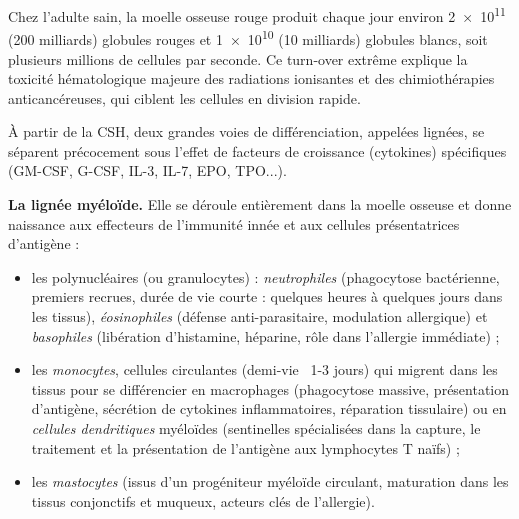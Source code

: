 \documentclass[11pt]{article}
\newcommand{\cle}[1]{{\popxbold\color{popdark}#1}}
\begin{document}
\begin{savaistu}
Chez l'adulte sain, la moelle osseuse rouge produit chaque jour environ \num{2e11} (200 milliards) globules rouges et \num{1e10} (10 milliards) globules blancs, soit plusieurs millions de cellules par seconde. Ce turn-over extrême explique la toxicité hématologique majeure des radiations ionisantes et des chimiothérapies anticancéreuses, qui ciblent les cellules en division rapide.
\end{savaistu}

À partir de la CSH, deux grandes voies de différenciation, appelées \cle{lignées}, se séparent précocement sous l'effet de facteurs de croissance (cytokines) spécifiques (GM-CSF, G-CSF, IL-3, IL-7, EPO, TPO...).

\textbf{La lignée myéloïde.} Elle se déroule entièrement dans la moelle osseuse et donne naissance aux effecteurs de l'immunité innée et aux cellules présentatrices d'antigène :
\begin{itemize}
\item les \cle{polynucléaires} (ou granulocytes) : \emph{neutrophiles} (phagocytose bactérienne, premiers recrues, durée de vie courte : quelques heures à quelques jours dans les tissus), \emph{éosinophiles} (défense anti-parasitaire, modulation allergique) et \emph{basophiles} (libération d'histamine, héparine, rôle dans l'allergie immédiate) ;
\item les \emph{monocytes}, cellules circulantes (demi-vie ~1-3 jours) qui migrent dans les tissus pour se différencier en \cle{macrophages} (phagocytose massive, présentation d'antigène, sécrétion de cytokines inflammatoires, réparation tissulaire) ou en \emph{cellules dendritiques} myéloïdes (sentinelles spécialisées dans la capture, le traitement et la présentation de l'antigène aux lymphocytes T naïfs) ;
\item les \emph{mastocytes} (issus d'un progéniteur myéloïde circulant, maturation dans les tissus conjonctifs et muqueux, acteurs clés de l'allergie).
\end{itemize}
\end{document}
